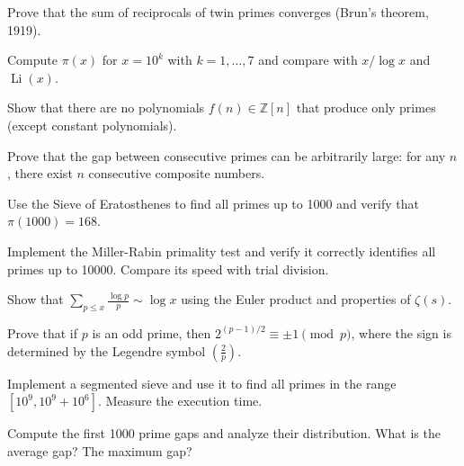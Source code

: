 \begin{exercise}
Prove that the sum of reciprocals of twin primes converges (Brun's theorem, 1919).
\end{exercise}

\begin{exercise}[Computational]
Compute $\pi(x)$ for $x = 10^k$ with $k = 1, \ldots, 7$ and compare with $x/\log x$ and $\operatorname{Li}(x)$.
\end{exercise}

\begin{exercise}
Show that there are no polynomials $f(n) \in \mathbb{Z}[n]$ that produce only primes (except constant polynomials).
\end{exercise}

\begin{exercise}
Prove that the gap between consecutive primes can be arbitrarily large: for any $n$, there exist $n$ consecutive composite numbers.
\end{exercise}

\begin{exercise}
Use the Sieve of Eratosthenes to find all primes up to 1000 and verify that $\pi(1000) = 168$.
\end{exercise}

\begin{exercise}[Computational]
Implement the Miller-Rabin primality test and verify it correctly identifies all primes up to 10000. Compare its speed with trial division.
\end{exercise}

\begin{exercise}
Show that $\sum_{p \le x} \frac{\log p}{p} \sim \log x$ using the Euler product and properties of $\zeta(s)$.
\end{exercise}

\begin{exercise}
Prove that if $p$ is an odd prime, then $2^{(p-1)/2} \equiv \pm 1 \pmod{p}$, where the sign is determined by the Legendre symbol $\left(\frac{2}{p}\right)$.
\end{exercise}

\begin{exercise}[Computational]
Implement a segmented sieve and use it to find all primes in the range $[10^9, 10^9 + 10^6]$. Measure the execution time.
\end{exercise}

\begin{exercise}
Compute the first 1000 prime gaps and analyze their distribution. What is the average gap? The maximum gap?
\end{exercise}

